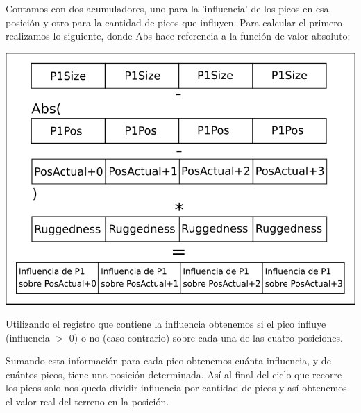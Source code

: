 Contamos con dos acumuladores, uno para la 'influencia' de los picos en esa posición y otro para la cantidad de picos que influyen. Para calcular el primero realizamos lo siguiente, donde Abs hace referencia a la función de valor absoluto:

\begin{center}
\includegraphics[scale=0.5]{imagenes/calculoInfluencia.png} 
\end{center}

Utilizando el registro que contiene la influencia obtenemos si el pico influye (influencia $>$ 0) o no (caso contrario) sobre cada una de las cuatro posiciones.

Sumando esta información para cada pico obtenemos cuánta influencia, y de cuántos picos, tiene una posición determinada. Así al final del ciclo que recorre los picos solo nos queda dividir influencia por cantidad de picos y así obtenemos el valor real del terreno en la posición.
